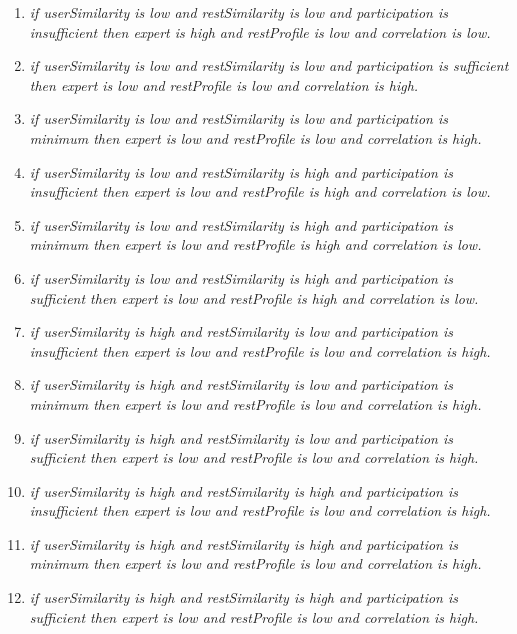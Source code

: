 \documentclass[12pt,letterpaper,oneside] {memoir}
\begin{document}
\begin{enumerate}
\item \textit{if userSimilarity is low and restSimilarity is low 
 and participation is insufficient then expert is high 
 and restProfile is low and correlation is low.}
 
\item \textit{if userSimilarity is low and restSimilarity is low 
 and participation is sufficient then expert is low 
 and restProfile is low and correlation is high.}
 
\item \textit{if userSimilarity is low and restSimilarity is low 
 and participation is minimum then expert is low 
 and restProfile is low and correlation is high.}
 
\item \textit{if userSimilarity is low and restSimilarity is high 
 and participation is insufficient then expert is low 
 and restProfile is high and correlation is low.}
 
\item \textit{if userSimilarity is low and restSimilarity is high 
 and participation is minimum then expert is low
 and restProfile is high and correlation is low.}
   
\item \textit{if userSimilarity is low and restSimilarity is high
 and participation is sufficient then expert is low 
 and restProfile is high and correlation is low.}   
 
\item \textit{if userSimilarity is high and restSimilarity is low 
 and participation is insufficient then expert is low 
 and restProfile is low and correlation is high.}     
   
\item \textit{if userSimilarity is high and restSimilarity is low 
 and participation is minimum then expert is low 
 and restProfile is low and correlation is high.}  
 
\item \textit{if userSimilarity is high and restSimilarity is low 
 and participation is sufficient then expert is low 
 and restProfile is low and correlation is high.}
    
\item \textit{if userSimilarity is high and restSimilarity is high 
 and participation is insufficient then expert is low 
 and restProfile is low and correlation is high.}
 
\item \textit{if userSimilarity is high and restSimilarity is high 
 and participation is minimum then expert is low 
 and restProfile is low and correlation is high.}
 
\item \textit{if userSimilarity is high and restSimilarity is high 
 and participation is sufficient then expert is low 
 and restProfile is low and correlation is high.}

\end{enumerate}
\end{document}
